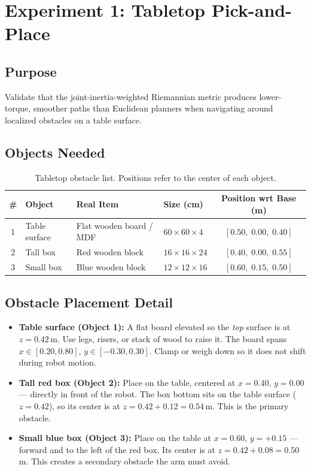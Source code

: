 \documentclass[11pt]{article}
\begin{document}
\newpage
\section{Experiment 1: Tabletop Pick-and-Place}

\subsection{Purpose}
Validate that the joint-inertia-weighted Riemannian metric produces lower-torque, smoother paths than Euclidean planners when navigating around localized obstacles on a table surface.

\subsection{Objects Needed}

\begin{table}[h]
\centering
\begin{tabular}{@{}clllc@{}}
\toprule
\# & Object & Real Item & Size (cm) & Position wrt Base (m) \\
\midrule
1 & Table surface & Flat wooden board / MDF & $60 \times 60 \times 4$ & $[0.50,\; 0.00,\; 0.40]$ \\
2 & Tall box & Red wooden block & $16 \times 16 \times 24$ & $[0.40,\; 0.00,\; 0.55]$ \\
3 & Small box & Blue wooden block & $12 \times 12 \times 16$ & $[0.60,\; 0.15,\; 0.50]$ \\
\bottomrule
\end{tabular}
\caption{Tabletop obstacle list. Positions refer to the center of each object.}
\end{table}

\subsection{Obstacle Placement Detail}

\begin{itemize}[itemsep=2pt]
  \item \textbf{Table surface (Object 1):} A flat board elevated so the \emph{top} surface is at $z = 0.42$\,m. Use legs, risers, or stack of wood to raise it. The board spans $x \in [0.20, 0.80]$, $y \in [-0.30, 0.30]$. Clamp or weigh down so it does not shift during robot motion.
  \item \textbf{Tall red box (Object 2):} Place on the table, centered at $x=0.40$, $y=0.00$ --- directly in front of the robot. The box bottom sits on the table surface ($z=0.42$), so its center is at $z = 0.42 + 0.12 = 0.54$\,m. This is the primary obstacle.
  \item \textbf{Small blue box (Object 3):} Place on the table at $x=0.60$, $y=+0.15$ --- forward and to the left of the red box. Its center is at $z = 0.42 + 0.08 = 0.50$\,m. This creates a secondary obstacle the arm must avoid.
\end{itemize}
\end{document}
